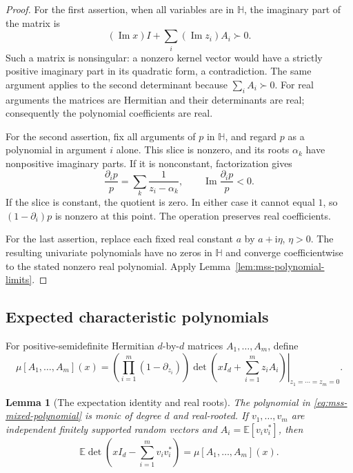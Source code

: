 \documentclass[11pt]{amsart}
\newtheorem{lemma}[theorem]{Lemma}
\theoremstyle{definition}
\theoremstyle{remark}
\numberwithin{equation}{section}
\begin{document}
\begin{proof}
For the first assertion, when all variables are in $\mathbb H$,
the imaginary part of the matrix is
\[
 (\operatorname{Im}x)I+\sum_i(\operatorname{Im}z_i)A_i\succ0.
\]
Such a matrix is nonsingular: a nonzero kernel vector would have a
strictly positive imaginary part in its quadratic form, a
contradiction.  The same argument applies to the second determinant
because $\sum_iA_i\succ0$.  For real arguments the matrices are
Hermitian and their determinants are real; consequently the
polynomial coefficients are real.

For the second assertion, fix all arguments of $p$ in $\mathbb H$,
and regard $p$ as a polynomial in argument $i$ alone.  This slice is
nonzero, and its roots $\alpha_k$ have nonpositive imaginary parts.
If it is nonconstant, factorization gives
\begin{equation}
 \frac{\partial_i p}{p}
   =\sum_k\frac1{z_i-\alpha_k},
 \qquad
 \operatorname{Im}\frac{\partial_i p}{p}<0.
 \label{eq:mss-log-derivative-upper}
\end{equation}
If the slice is constant, the quotient is zero.  In either case it
cannot equal $1$, so $(1-\partial_i)p$ is nonzero at this point.
The operation preserves real coefficients.

For the last assertion, replace each fixed real constant $a$ by
$a+\mathrm i\eta$, $\eta>0$.  The resulting univariate polynomials
have no zeros in $\mathbb H$ and converge coefficientwise to the
stated nonzero real polynomial.  Apply
Lemma~\ref{lem:mss-polynomial-limits}.
\end{proof}

\subsection{Expected characteristic polynomials}

For positive-semidefinite Hermitian $d$-by-$d$ matrices
$A_1,\ldots,A_m$, define
\begin{equation}
 \mu[A_1,\ldots,A_m](x)
 =\left.
   \left(\prod_{i=1}^m(1-\partial_{z_i})\right)
   \det\left(xI_d+\sum_{i=1}^m z_iA_i\right)
   \right|_{z_1=\cdots=z_m=0}.
 \label{eq:mss-mixed-polynomial}
\end{equation}

\begin{lemma}[The expectation identity and real roots]
\label{lem:mss-expectation}
The polynomial in \eqref{eq:mss-mixed-polynomial} is monic of degree
$d$ and real-rooted.  If $v_1,\ldots,v_m$ are independent finitely
supported random vectors and $A_i=\mathbb E[v_iv_i^*]$, then
\begin{equation}
 \mathbb E\det\left(xI_d-\sum_{i=1}^m v_iv_i^*\right)
 =\mu[A_1,\ldots,A_m](x).
 \label{eq:mss-expectation-identity}
\end{equation}
\end{lemma}
\end{document}
